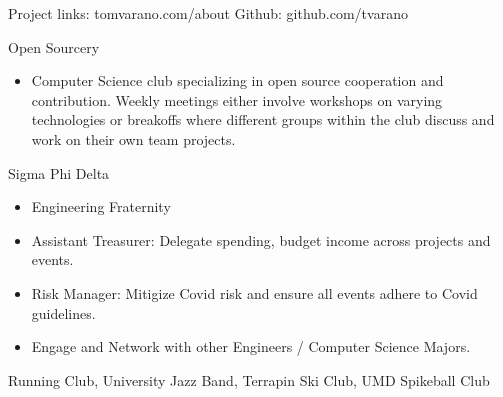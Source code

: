 \documentclass[11pt]{article}
\begin{document}
{%
}
{\fontsize{8}{10}\robotocondlight Project links: tomvarano.com/about \hfill Github: github.com/tvarano
}
\hsep
{\fontsize{10}{12}\robotocondlight
\noindent Open Sourcery
\begin{itemize}[noitemsep,nolistsep]
    \item Computer Science club specializing in open source cooperation and contribution. Weekly meetings either involve workshops on varying 
    technologies or breakoffs where different groups within the club discuss and work on their own team projects. 
\end{itemize}
Sigma Phi Delta
\begin{itemize}[noitemsep,nolistsep]
    \item Engineering Fraternity
    \item Assistant Treasurer: Delegate spending, budget income across projects and events.
    \item Risk Manager: Mitigize Covid risk and ensure all events adhere to Covid guidelines. 
    \item Engage and Network with other Engineers / Computer Science Majors.
\end{itemize}
Running Club, University Jazz Band, Terrapin Ski Club, UMD Spikeball Club
}
\end{document}

